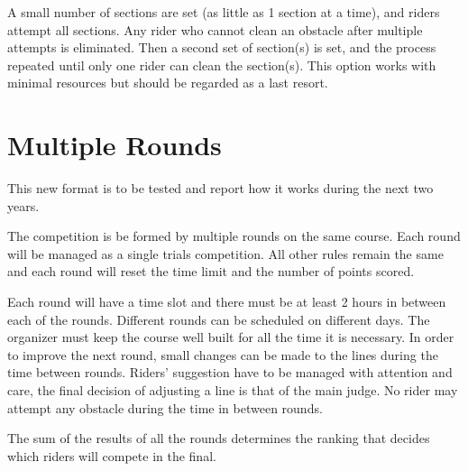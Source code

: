 A small number of sections are set (as little as 1 section at a time), and riders attempt all sections. 
Any rider who cannot clean an obstacle after multiple attempts is eliminated. 
Then a second set of section(s) is set, and the process repeated until only one rider can clean the section(s). 
This option works with minimal resources but should be regarded as a last resort.

\section{Multiple Rounds}
This new format is to be tested and report how it works during the next two years.

The competition is be formed by multiple rounds on the same course. 
Each round will be managed as a single trials competition. 
All other rules remain the same and each round will reset the time limit and the number of points scored. 

Each round will have a time slot and there must be at least 2 hours in between each of the rounds. 
Different rounds can be scheduled on different days.
The organizer must keep the course well built for all the time it is necessary. 
In order to improve the next round, small changes can be made to the lines during the time between rounds. 
Riders' suggestion have to be managed with attention and care, the final decision of adjusting a line is that of the main judge. 
No rider may attempt any obstacle during the time in between rounds.

The sum of the results of all the rounds determines the ranking that decides which riders will compete in the final.